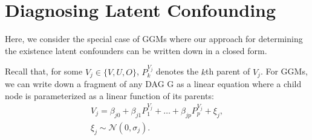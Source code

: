 \documentclass{article}
\begin{document}
\section{Diagnosing Latent Confounding} 

Here, we consider the special case of GGMs where our approach for determining the existence latent confounders can be written down in a closed form. 

Recall that, for some $V_j \in \{V, U, O\}$, $P^{V_j}_k$ denotes the $k$th parent of $V_j$.  For GGMs, we can write down a fragment of any DAG G as a linear equation where a child node is parameterized as a linear function of its parents:
\begin{equation}
\begin{align*}
V_j = \beta_{j0} + \beta_{j1} P^{V_j}_1 + \dots + \beta_{jp} P^{V_j}_p + \xi_j,\\\xi_j \sim \mathcal{N}(0, \sigma_j).
\end{align*}
\end{equation}	
\end{document}

